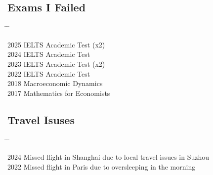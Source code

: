 \documentclass[10pt,a4paper]{article}
\newcommand{\tabbedblock}[1]{

	\begin{tabbing}
		\hspace{2cm} \= \hspace{4cm} \= \kill
		#1
	\end{tabbing}
}
\begin{document}
\subsection*{Exams I Failed}

\tabbedblock{
	2025\> IELTS Academic Test (x2) \\
	2024 \> IELTS Academic Test\\
	2023 \> IELTS Academic Test (x2) \\
	2022 \> IELTS Academic Test \\
	2018 \> Macroeconomic Dynamics \\
	2017 \> Mathematics for Economists
}

\subsection*{Travel Isuses}

\tabbedblock{
	2024 \> Missed flight in Shanghai due to local travel issues in Suzhou \\
	2022\> Missed flight in Paris due to oversleeping in the morning 
}

\end{document}
